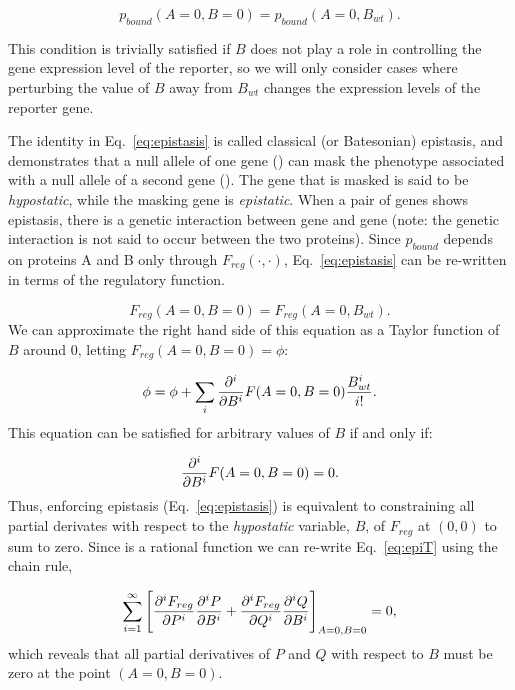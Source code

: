 \begin{equation}
    p_{bound}(A=0, B=0) = p_{bound}(A=0, B_{wt}).
    \label{eq:epistasis}
\end{equation}

This condition is trivially satisfied if \(B\) does not play a role in
controlling the gene expression level of the reporter, so we will only consider
cases where perturbing the value of \(B\) away from \(B_{wt}\) changes the
expression levels of the reporter gene.

The identity in Eq.~\ref{eq:epistasis} is called classical (or Batesonian)
epistasis, and demonstrates that a null allele of one gene () can mask
the phenotype associated with a null allele of a second gene (). The
gene that is masked is said to be \emph{hypostatic}, while the masking gene is
\emph{epistatic}. When a pair of genes shows epistasis, there is a genetic
interaction between gene  and gene  (note: the genetic
interaction is not said to occur between the two proteins). Since \(p_{bound}\)
depends on proteins A and B only through \(F_{reg}(\cdot,\cdot)\),
Eq.~\ref{eq:epistasis} can be re-written in terms of the regulatory function.

\begin{equation*}
    F_{reg}(A=0, B=0) = F_{reg}(A=0, B_{wt}).
\end{equation*}
We can approximate the right hand side of this equation as a Taylor function of
\(B\) around 0, letting \(F_{reg}(A=0, B=0) = \phi \):

\begin{equation*}
  \phi = \phi + \sum_i \frac{\partial^{i} {}} {\partial {B}^{i}} F(A=0, B=0) \frac{B_{wt}^i}{i!}.
\end{equation*}
This equation can be satisfied for arbitrary values of \(B\) if and only if:

\begin{equation}
  \frac{\partial^{i} {}} {\partial {B}^{i}} F(A=0, B=0) = 0.
  \label{eq:epiT}
\end{equation}
Thus, enforcing epistasis (Eq.~\ref{eq:epistasis}) is equivalent to constraining
all partial derivates with respect to the \emph{hypostatic} variable, \(B\), of
\(F_{reg}\) at \((0, 0)\) to sum to zero. Since \Freg{} is a rational function
we can re-write Eq.~\ref{eq:epiT} using the chain rule,

\begin{equation*}
  \sum_{i=1}^\infty
    \Bigg {[} \pder{F_{reg}}{P}{i}  %
              \pder{P}{B}{i}  %
    + \pder{F_{reg}}{Q}{i}  %
      \pder{Q}{B}{i}  %
    \Bigg {]}_{A=0, B=0}
    = 0,
  \label{eq:key}
\end{equation*}
which reveals that all partial derivatives of \(P\) and \(Q\) with respect to
\(B\) must be zero at the point \((A=0, B=0)\).


